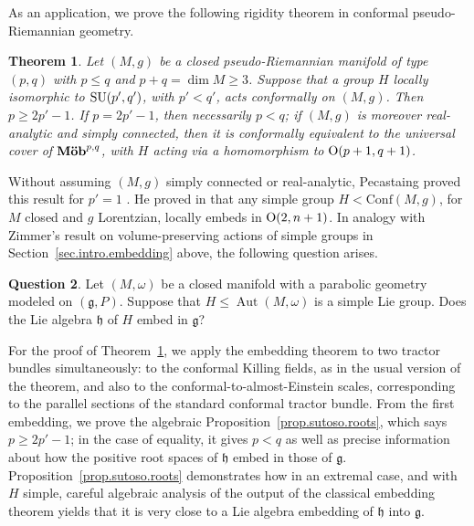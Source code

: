 \documentclass[10pt,a4paper]{amsart}
\numberwithin{equation}{section}
\newtheorem{thm}{Theorem}[section]
\theoremstyle{definition}
\newtheorem{Question}[thm]{Question}
\newcommand{\lieg}{\mathfrak{g}}
\newcommand{\lieh}{\mathfrak{h}}
\newcommand{\Aut}{\operatorname{Aut}}
\newcommand{\SU}{{\rm SU}}
\begin{document}
As an application, we prove the following rigidity theorem in conformal pseudo-Riemannian geometry.


\begin{thm}
\label{thm.conf.application}
Let $(M,g)$ be a closed pseudo-Riemannian manifold of type $(p,q)$ with $p\leq q$ and $p+q = \dim M \geq 3$. Suppose that a group $H$ locally isomorphic to $\SU(p',q')$, with $p'<q'$, acts conformally on $(M,g)$. Then $p \geq 2p'-1$. If $p=2p'-1$, then necessarily $p<q$; if $(M,g)$ is moreover real-analytic and simply connected, then it is conformally equivalent to the universal cover of $\mbox{{\bf M\"ob}}^{p,q}$, with $H$ acting via a homomorphism to ${\rm O}(p+1,q+1)$.
\end{thm}


Without assuming $(M,g)$ simply connected or real-analytic, Pecastaing proved this result for $p'=1$ \cite[Corollary~1]{pecastaing.smooth.sl2r}. He proved in \cite[Theorem~3]{pecastaing.rank1} that any simple group $H < \mbox{Conf}(M,g)$, for $M$ closed and $g$ Lorentzian, locally embeds in ${\rm O}(2,n+1)$. In analogy with Zimmer's result on volume-preserving actions of simple groups
in Section~\ref{sec.intro.embedding} above, the following question arises.

\begin{Question}\label{quest.simple.embed}
Let $(M,\omega)$ be a closed manifold with a parabolic geometry modeled on $(\lieg, P)$. Suppose that $H \leq \Aut(M, \omega)$ is a simple Lie group. Does the Lie algebra $\lieh$ of $H$ embed in $\lieg$?
\end{Question}

For the proof of Theorem~\ref{thm.conf.application}, we apply the embedding theorem to two tractor bundles simultaneously: to the conformal Killing fields, as in the usual version of the theorem, and also to the conformal-to-almost-Einstein scales, corresponding to the parallel sections of the standard conformal tractor bundle.
From the first embedding, we prove the algebraic Proposition~\ref{prop.sutoso.roots}, which says $p \geq 2 p'-1$; in the case of equality, it gives $p< q$ as well as precise information about how the positive root spaces of $\lieh$ embed in those of $\lieg$. Proposition~\ref{prop.sutoso.roots} demonstrates how in an extremal case, and with $H$ simple, careful algebraic analysis of the output of the classical embedding theorem yields that it is very close to a Lie algebra embedding of $\lieh$ into $\lieg$.
\end{document}

